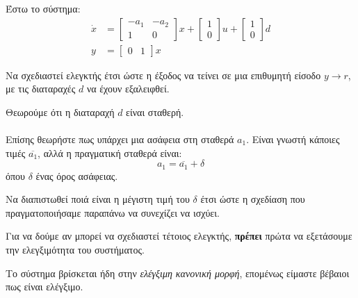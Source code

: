 \documentclass[11pt,a4paper,notitlepage,fleqn]{article}
\begin{document}
\begin{exercise}
	Έστω το σύστημα:
	\begin{align*}
		\dot x &= \left[\begin{matrix}
		-a_1 & -a_2 \\ 1 & 0
		\end{matrix}\right]x + \left[\begin{matrix}
		1 \\ 0
		\end{matrix}\right]u + \left[\begin{matrix}
		1 \\ 0
		\end{matrix}\right]d \\
		y &= \left[\begin{matrix}
		0 & 1
		\end{matrix}\right]x
	\end{align*}

	Να σχεδιαστεί ελεγκτής έτσι ώστε η έξοδος να τείνει σε μια επιθυμητή είσοδο \( y \to r \), με τις διαταραχές \( d \) να έχουν εξαλειφθεί.

	Θεωρούμε ότι η διαταραχή \( d \) είναι σταθερή.

	\paragraph{}
	Επίσης θεωρήστε πως υπάρχει μια ασάφεια στη σταθερά \( a_1 \).
	Είναι γνωστή κάποιες τιμές \( \overline{a_1} \), αλλά η πραγματική σταθερά είναι:
	\[
	a_1 = \overline{a_1} + \delta
	\]
	όπου \( \delta \) ένας όρος ασάφειας.

	Να διαπιστωθεί ποιά είναι η μέγιστη τιμή του \( δ \) έτσι ώστε η σχεδίαση που πραγματοποιήσαμε παραπάνω να συνεχίζει να ισχύει.

	\tcblower
	Για να δούμε αν μπορεί να σχεδιαστεί τέτοιος ελεγκτής, \textbf{πρέπει} πρώτα να εξετάσουμε
	την ελεγξιμότητα του συστήματος.

	Το σύστημα βρίσκεται ήδη στην \textit{ελέγξιμη κανονική μορφή}, επομένως
	είμαστε βέβαιοι πως είναι ελέγξιμο.


\end{exercise}
\end{document}
